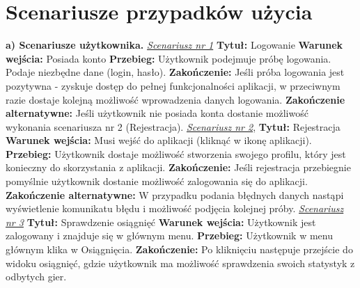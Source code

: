 	\newpage
\section{Scenariusze przypadków użycia}  %
\textbf{a) Scenariusze użytkownika.}
\newline \textit{\underline{Scenariusz nr 1}}
\newline \textbf{Tytuł:} Logowanie
\newline \textbf{Warunek wejścia:} Posiada konto
\newline \textbf{Przebieg:} Użytkownik podejmuje próbę logowania. Podaje niezbędne dane (login, hasło).  
\newline \textbf{Zakończenie:} Jeśli próba logowania jest pozytywna - zyskuje dostęp do pełnej funkcjonalności aplikacji, w przeciwnym razie dostaje kolejną możliwość wprowadzenia danych logowania.
\newline \textbf{Zakończenie alternatywne:} Jeśli użytkownik nie posiada konta dostanie możliwość wykonania scenariusza nr 2 (Rejestracja).
\newline\newline \textit{\underline{Scenariusz nr 2}}, 
\newline \textbf{Tytuł:} Rejestracja
\newline \textbf{Warunek wejścia:} Musi wejść do aplikacji (kliknąć w ikonę aplikacji).
\newline \textbf{Przebieg:} Użytkownik dostaje możliwość stworzenia swojego profilu, który jest konieczny do skorzystania z aplikacji.
\newline \textbf{Zakończenie:} Jeśli rejestracja przebiegnie pomyślnie użytkownik dostanie możliwość zalogowania się do aplikacji.
\newline \textbf{Zakończenie alternatywne:} W przypadku podania błędnych danych nastąpi wyświetlenie komunikatu błędu i możliwość podjęcia kolejnej próby.
\newline\newline \textit{\underline{Scenariusz nr 3}}
\newline \textbf{Tytuł:} Sprawdzenie osiągnięć
\newline \textbf{Warunek wejścia:} Użytkownik jest zalogowany i znajduje się w głównym menu.
\newline \textbf{Przebieg:} Użytkownik w menu głównym klika w Osiągnięcia.
\newline \textbf{Zakończenie:} Po kliknięciu następuje przejście do widoku osiągnięć, gdzie użytkownik ma możliwość sprawdzenia swoich statystyk z odbytych gier.
